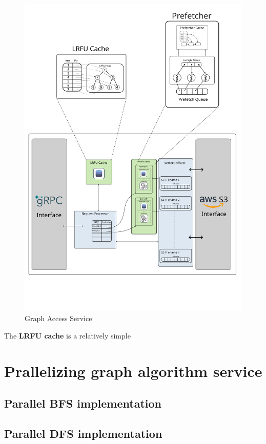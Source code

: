 \begin{figure}[ht]
    \centering
    \includegraphics[width=\textwidth]{figures/graphAccessServiceFinal.png}
    \caption{Graph Access Service}
    \label{fig:graphAccessArch}
\end{figure}

\medskip
The \textbf{LRFU cache} is a relatively simple 

\section{Prallelizing graph algorithm service}\label{sec:parallelAlgorithms}
\subsection{Parallel BFS implementation}
\subsection{Parallel DFS implementation}
